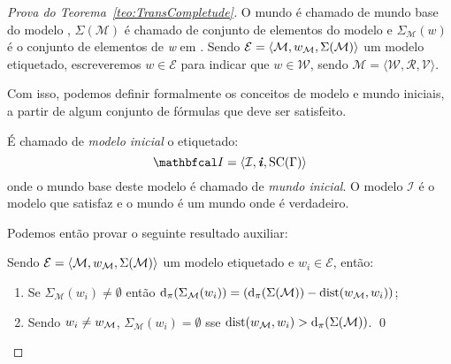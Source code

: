 \begin{apendicesenv}
\begin{proof}[Prova do Teorema~\ref{teo:TransCompletude}]
            O mundo \Mundobase é chamado de mundo base do modelo , \(\Sigma(\mathcal{M})\) é chamado de conjunto de elementos do modelo  e
            \(\Sigma_{\mathcal{M}}(w)\) é o conjunto de elementos de \textit{w} em .
            Sendo \(\mathcal{E} = \langle \mathcal{M}, w_{\mathcal{M}}, \Sigma(\mathcal{M}) \rangle\) um modelo etiquetado, escreveremos \(w \in \mathcal{E}\)
            para indicar que \(w \in \mathcal{W}\), sendo \(\mathcal{M} = \langle \mathcal{W}, \mathcal{R}, \mathcal{V} \rangle\).

            Com isso, podemos definir formalmente os conceitos de modelo e mundo iniciais, a partir de algum conjunto de fórmulas \GAMMA que deve ser satisfeito.

            \begin{definicao}
                É chamado de \textit{modelo inicial} o \PImodelo etiquetado:
                \[
                    \modeloinicial = \langle \mathcal{I}, \mundoinicial, \funcao{SC}(\Gamma) \rangle
                \]
                onde o mundo base \Mundoinicial deste modelo é chamado de \textit{mundo inicial}. O modelo \(\mathcal{I}\) é o modelo que satisfaz
                \GAMMA e o mundo \Mundoinicial é um mundo onde \GAMMA é verdadeiro.
            \end{definicao}

            Podemos então provar o seguinte resultado auxiliar:

            \begin{lema}
                \label{teo:Lema1}
                Sendo \(\mathcal{E} = \langle \mathcal{M}, w_{\mathcal{M}}, \Sigma(\mathcal{M}) \rangle\) um modelo etiquetado e \(w_i \in \mathcal{E}\), então:
                \begin{enumerate}[label=\textnormal{\ref{teo:Lema1}.\arabic*}]
                    \item \textnormal{Se \(\Sigma_{\mathcal{M}}(w_i) \neq \emptyset\) então \(\operatorname{d}_{\pi}(\Sigma_{\mathcal{M}}(w_i)) = (\operatorname{d}_{\pi}(\Sigma(\mathcal{M})) - \operatorname{dist}(w_{\mathcal{M}}, w_i))\);}\label{caso:Lema1-1}
                    \item \textnormal{Sendo \(w_i \neq w_{\mathcal{M}}\), \(\Sigma_{\mathcal{M}}(w_i) = \emptyset\) sse \(\operatorname{dist}(w_{\mathcal{M}}, w_i) > \operatorname{d}_{\pi}(\Sigma(\mathcal{M}))\).}\label{caso:Lema1-2} \qed
                \end{enumerate}
            \end{lema}


\end{proof}
\end{apendicesenv}
